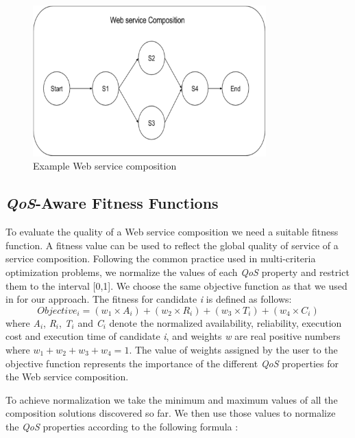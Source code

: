 \begin{figure}[H]
\includegraphics[width=9cm]{Figure2-1ExampleWebServiceComposition.pdf}
\centering
\caption{Example Web service composition}
\end{figure} 

\subsection {\emph{QoS}-Aware Fitness Functions} \label{fitnessFunction}

To evaluate the quality of a Web service composition we need a suitable fitness function. A fitness value can be used to reflect the global quality of service of a service composition. Following the common practice  \cite{19,14,4} used in multi-criteria optimization problems, we normalize the values of each \emph{QoS} property and restrict them to the interval [0,1]. We choose the same objective function as that we used in \cite{19,4} for our approach. The fitness for candidate \emph{i} is defined as follows:
\begin{equation}
Objective_{i}=(w_{1} \times A_{i}) + (w_{2} \times R_{i}) + (w_{3} \times T_{i}) + (w_{4} \times C_{i})
\end{equation}
\noindent
where \emph{A$_{i}$}, \emph{R$_{i}$}, \emph{T$_{i}$} and  \emph{C$_{i}$} denote the normalized availability, reliability,  execution cost and  execution time of candidate \emph{i}, and weights \emph{w} are real positive numbers where $w_{1} + w_{2} + w_{3} + w_{4} = 1$. The value of weights assigned by the user to the objective function represents the importance of the different \emph{QoS} properties for the Web service composition. \par

To achieve normalization we take the minimum and maximum values of all the composition solutions discovered so far. We then use those values to normalize the \emph{QoS} properties according to the following formula \cite{4}:


